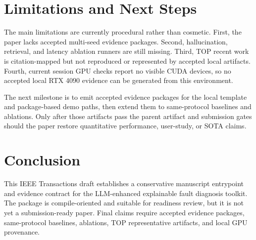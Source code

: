 \documentclass[journal]{IEEEtran}
\begin{document}
\section{Limitations and Next Steps}
The main limitations are currently procedural rather than cosmetic. First, the
paper lacks accepted multi-seed evidence packages. Second, hallucination,
retrieval, and latency ablation runners are still missing. Third, TOP recent
work is citation-mapped but not reproduced or represented by accepted local
artifacts. Fourth, current session GPU checks report no visible CUDA devices,
so no accepted local RTX 4090 evidence can be generated from this environment.

The next milestone is to emit accepted evidence packages for the local template
and package-based demo paths, then extend them to same-protocol baselines and
ablations. Only after those artifacts pass the parent artifact and submission
gates should the paper restore quantitative performance, user-study, or SOTA
claims.

\section{Conclusion}
This IEEE Transactions draft establishes a conservative manuscript entrypoint
and evidence contract for the LLM-enhanced explainable fault diagnosis toolkit.
The package is compile-oriented and suitable for readiness review, but it is
not yet a submission-ready paper. Final claims require accepted evidence
packages, same-protocol baselines, ablations, TOP representative artifacts, and
local GPU provenance.



\end{document}
